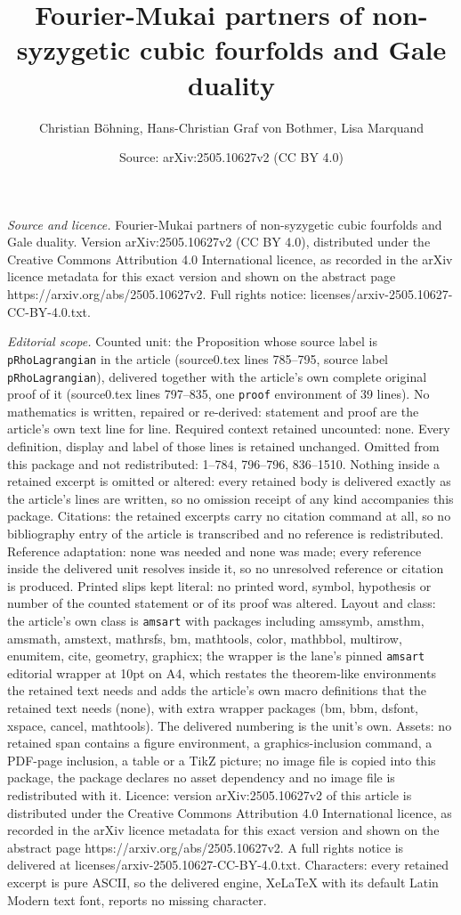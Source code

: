\documentclass[10pt,a4paper]{amsart}
\title[Fourier-Mukai partners of non-syzygetic cubic fourfolds and ]{Fourier-Mukai partners of non-syzygetic cubic fourfolds and Gale duality}
\author{Christian B\"ohning, Hans-Christian Graf von Bothmer, Lisa Marquand}
\date{Source: arXiv:2505.10627v2 (CC BY 4.0)}
\begin{document}
\maketitle

\noindent\emph{Source and licence.} Fourier-Mukai partners of non-syzygetic cubic fourfolds and Gale duality. Version arXiv:2505.10627v2 (CC BY 4.0), distributed under the Creative Commons Attribution 4.0 International licence, as recorded in the arXiv licence metadata for this exact version and shown on the abstract page https://arxiv.org/abs/2505.10627v2. Full rights notice: licenses/arxiv-2505.10627-CC-BY-4.0.txt.\par\smallskip

\noindent\textit{Editorial scope.} Counted unit: the Proposition whose source label is \texttt{pRhoLagrangian} in the article (source0.tex lines 785--795, source label \texttt{pRhoLagrangian}), delivered together with the article's own complete original proof of it (source0.tex lines 797--835, one \texttt{proof} environment of 39 lines). No mathematics is written, repaired or re-derived: statement and proof are the article's own text line for line. Required context retained uncounted: none. Every definition, display and label of those lines is retained unchanged. Omitted from this package and not redistributed: 1--784, 796--796, 836--1510. Nothing inside a retained excerpt is omitted or altered: every retained body is delivered exactly as the article's lines are written, so no omission receipt of any kind accompanies this package. Citations: the retained excerpts carry no citation command at all, so no bibliography entry of the article is transcribed and no reference is redistributed. Reference adaptation: none was needed and none was made; every reference inside the delivered unit resolves inside it, so no unresolved reference or citation is produced. Printed slips kept literal: no printed word, symbol, hypothesis or number of the counted statement or of its proof was altered. Layout and class: the article's own class is \texttt{amsart} with packages including amssymb, amsthm, amsmath, amstext, mathrsfs, bm, mathtools, color, mathbbol, multirow, enumitem, cite, geometry, graphicx; the wrapper is the lane's pinned \texttt{amsart} editorial wrapper at 10pt on A4, which restates the theorem-like environments the retained text needs and adds the article's own macro definitions that the retained text needs (none), with extra wrapper packages (bm, bbm, dsfont, xspace, cancel, mathtools). The delivered numbering is the unit's own. Assets: no retained span contains a figure environment, a graphics-inclusion command, a PDF-page inclusion, a table or a TikZ picture; no image file is copied into this package, the package declares no asset dependency and no image file is redistributed with it. Licence: version arXiv:2505.10627v2 of this article is distributed under the Creative Commons Attribution 4.0 International licence, as recorded in the arXiv licence metadata for this exact version and shown on the abstract page https://arxiv.org/abs/2505.10627v2. A full rights notice is delivered at licenses/arxiv-2505.10627-CC-BY-4.0.txt. Characters: every retained excerpt is pure ASCII, so the delivered engine, XeLaTeX with its default Latin Modern text font, reports no missing character.
\end{document}

